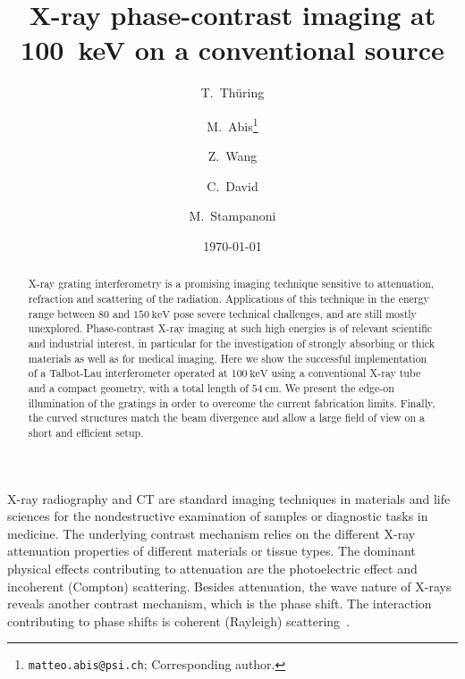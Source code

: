 \documentclass[english]{nature}
\begin{document}
\title{X-ray phase-contrast imaging at \SI{100}{\kilo\electronvolt} on
a conventional source}

\author[1,2]{T.~Thüring}
\author[1,2]{M.~Abis\thanks{\texttt{matteo.abis@psi.ch}; Corresponding author.}}
\author[1]{Z.~Wang}
\author[1]{C.~David}
\author[1,2]{M.~Stampanoni}

\date{\today}


\maketitle


\begin{abstract}
    X-ray grating interferometry is a promising imaging technique sensitive
    to attenuation, refraction and scattering of the radiation. Applications
    of this technique in the energy range between $\num{80}$ and
    $\SI{150}{\kilo\electronvolt}$ pose severe technical challenges, and are
    still mostly unexplored. Phase-contrast X-ray imaging at such high
    energies is of relevant scientific and industrial interest, in
    particular for the investigation of strongly absorbing or thick materials 
    as well as for medical imaging. Here we show the successful
    implementation of a Talbot-Lau interferometer operated at
    $\SI{100}{\kilo\electronvolt}$ using a conventional X-ray tube and a
    compact geometry, with a total length of $\SI{54}{\centi\metre}$. We
    present the edge-on illumination of the gratings in order to overcome
    the current fabrication limits. Finally, the curved structures match
    the beam divergence and allow a large field of view on a short and
    efficient setup.
\end{abstract}

X-ray radiography and \ac{CT} are standard imaging techniques in
materials and life sciences for the nondestructive examination of samples or
diagnostic tasks in medicine. The underlying contrast mechanism
relies on the different X-ray attenuation properties of different materials
or tissue types. The dominant physical effects contributing to attenuation
are the photoelectric effect and incoherent (Compton) scattering. Besides attenuation, the wave
nature of X-rays reveals another contrast mechanism, which is the phase
shift. The interaction contributing to phase shifts is coherent (Rayleigh)
scattering~\cite{Als-Nielsen2011}.
\end{document}
